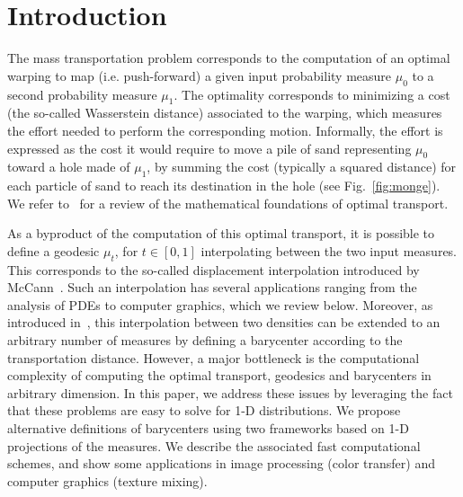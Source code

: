 \section{Introduction}

The mass transportation problem corresponds to the computation of an optimal warping to map (i.e. push-forward) a given input probability measure $\mu_0$ to a second probability measure $\mu_1$. The optimality corresponds to minimizing a cost (the so-called Wasserstein distance) associated to the warping, which measures the effort needed to perform the corresponding motion. Informally, the effort is expressed as the cost it would require to move a pile of sand representing $\mu_0$ toward a hole made of $\mu_1$, by summing the cost (typically a squared distance) for each particle of sand to reach its destination in the hole (see Fig.~\ref{fig:monge}).  We refer to~\cite{Villani03} for a review of the mathematical foundations of optimal transport. 

As a byproduct of the computation of this optimal transport, it is possible to define a geodesic $\mu_t$, for $t \in [0, 1]$ interpolating between the two input measures. This corresponds to the so-called displacement interpolation introduced by McCann~\cite{mccann1997convexity}. Such an interpolation has several  applications ranging from the analysis of PDEs to computer graphics, which we review below. Moreover, as introduced in~\cite{Carlier_wasserstein_barycenter}, this interpolation between two densities can be extended to an arbitrary number of measures by defining a barycenter according to the transportation distance. However, a major bottleneck is the computational complexity of computing the optimal transport, geodesics and barycenters in arbitrary dimension.  In this paper, we address these issues by leveraging the fact that these problems are easy to solve for 1-D distributions. We propose alternative definitions of barycenters using two frameworks based on 1-D projections of the measures. We describe the associated fast computational schemes, and show some applications in image processing (color transfer) and computer graphics (texture mixing).



